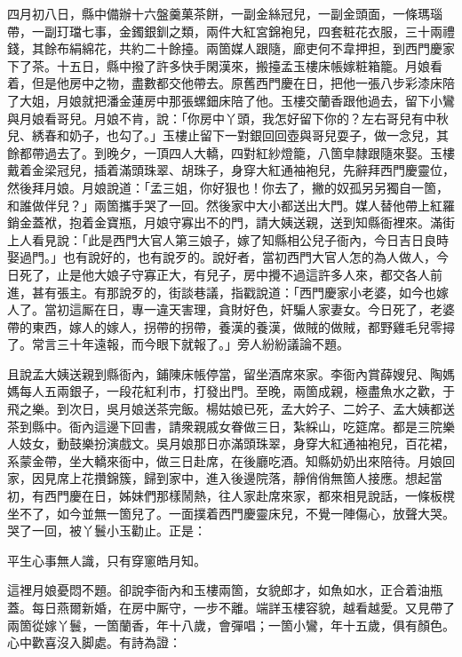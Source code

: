 四月初八日，縣中備辦十六盤羹菓茶餅，一副金絲冠兒，一副金頭面，一條瑪瑙帶，一副玎璫七事，金鐲銀釧之類，兩件大紅宮錦袍兒，四套粧花衣服，三十兩禮錢，其餘布絹綿花，共約二十餘擡。兩箇媒人跟隨，廊吏何不韋押担，到西門慶家下了茶。十五日，縣中撥了許多快手閑漢來，搬擡孟玉樓床帳嫁粧箱籠。月娘看着，但是他房中之物，盡數都交他帶去。原舊西門慶在日，把他一張八步彩漆床陪了大姐，月娘就把潘金蓮房中那張螺鈿床陪了他。{}玉樓交蘭香跟他過去，留下小鸞與月娘看哥兒。月娘不肯，說：「你房中丫頭，我怎好留下你的？左右哥兒有中秋兒、綉春和奶子，也勾了。」玉樓止留下一對銀回回壺與哥兒耍子，做一念兒，其餘都帶過去了。到晚夕，一頂四人大轎，四對紅紗燈籠，八箇皁隸跟隨來娶。玉樓戴着金梁冠兒，插着滿頭珠翠、胡珠子，身穿大紅通袖袍兒，先辭拜西門慶靈位，{}然後拜月娘。月娘說道：「孟三姐，你好狠也！你去了，撇的奴孤另另獨自一箇，和誰做伴兒？」{}兩箇攜手哭了一回。然後家中大小都送出大門。媒人替他帶上紅羅銷金蓋袱，抱着金寶瓶，月娘守寡出不的門，請大姨送親，送到知縣衙裡來。滿街上人看見說：「此是西門大官人第三娘子，嫁了知縣相公兒子衙內，今日吉日良時娶過門。」也有說好的，也有說歹的。說好者，當初西門大官人怎的為人做人，今日死了，止是他大娘子守寡正大，有兒子，房中攪不過這許多人來，都交各人前進，甚有張主。有那說歹的，街談巷議，指戳說道：「西門慶家小老婆，如今也嫁人了。當初這厮在日，專一違天害理，貪財好色，奸騙人家妻女。今日死了，老婆帶的東西，嫁人的嫁人，拐帶的拐帶，養漢的養漢，做賊的做賊，都野雞毛兒零撏了。常言三十年遠報，而今眼下就報了。」旁人紛紛議論不題。{}

且說孟大姨送親到縣衙內，鋪陳床帳停當，留坐酒席來家。李衙內賞薛嫂兒、陶媽媽每人五兩銀子，一段花紅利市，打發出門。至晚，兩箇成親，極盡魚水之歡，于飛之樂。到次日，吳月娘送茶完飯。楊姑娘已死，孟大妗子、二妗子、孟大姨都送茶到縣中。衙內這邊下回書，請衆親戚女眷做三日，紮綵山，吃筵席。都是三院樂人妓女，動鼓樂扮演戲文。吳月娘那日亦滿頭珠翠，身穿大紅通袖袍兒，百花裙，系蒙金帶，坐大轎來衙中，做三日赴席，在後廳吃酒。知縣奶奶出來陪待。月娘回家，因見席上花攢錦簇，歸到家中，進入後邊院落，靜俏俏無箇人接應。想起當初，有西門慶在日，姊妹們那樣鬧熱，往人家赴席來家，都來相見說話，一條板櫈坐不了，如今並無一箇兒了。一面撲着西門慶靈床兒，不覺一陣傷心，放聲大哭。{}哭了一回，被丫鬟小玉勸止。正是：

\begin{myquote}
平生心事無人識，只有穿窻皓月知。
\end{myquote}

這裡月娘憂悶不題。卻說李衙內和玉樓兩箇，女貌郎才，如魚如水，正合着油瓶蓋。每日燕爾新婚，在房中厮守，一步不離。{}端詳玉樓容貌，越看越愛。又見帶了兩箇從嫁丫鬟，一箇蘭香，年十八歲，會彈唱；一箇小鸞，年十五歲，俱有顏色。心中歡喜沒入脚處。有詩為證：

